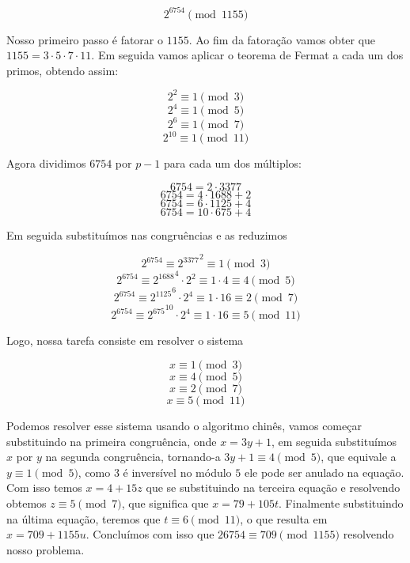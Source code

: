 $$ 2^{6754} \pmod{1155}$$

Nosso primeiro passo \'e fatorar o $1155$. Ao fim da fatora\c{c}\~ao vamos obter que $1155 = 3 \cdot 5 \cdot 7 \cdot 11$. Em seguida vamos aplicar o teorema de Fermat a cada um dos primos, obtendo assim:

$$ 2^2 \equiv 1 \pmod{3}$$
$$ 2^4 \equiv 1 \pmod{5}$$ 
$$ 2^6 \equiv 1 \pmod{7}$$  
$$ 2^{10} \equiv 1 \pmod{11}$$

Agora dividimos $6754$ por $p-1$ para cada um dos m\'ultiplos:

$$6754 = 2 \cdot 3377 $$
$$6754 = 4 \cdot 1688 + 2$$
$$6754 = 6 \cdot 1125 + 4$$
$$6754 = 10 \cdot 675 + 4$$ 

Em seguida substitu\'imos nas congru\^encias e as reduzimos

$$2^{6754} \equiv {2^{3377}}^{2} \equiv 1 \pmod{3} $$  
$$2^{6754} \equiv {2^{1688}}^{4} \cdot 2^2 \equiv 1 \cdot 4 \equiv  4 \pmod{5}$$  
$$2^{6754} \equiv {2^{1125}}^{6} \cdot 2^4 \equiv 1 \cdot 16\equiv  2 \pmod{7}$$ 
$$2^{6754} \equiv {2^{675}}^{10} \cdot 2^4 \equiv 1 \cdot 16\equiv  5 \pmod{11}$$  

Logo, nossa tarefa consiste em resolver o sistema

$$x \equiv 1 \pmod{3}$$
$$x \equiv 4 \pmod{5}$$
$$x \equiv 2 \pmod{7}$$
$$x \equiv 5 \pmod{11}$$  

Podemos resolver esse sistema usando o algoritmo chin\^es, vamos come\c{c}ar substituindo na primeira congru\^encia, onde $x = 3y + 1$, em seguida substitu\'imos $x$ por $y$ na segunda congru\^encia, tornando-a $3y + 1 \equiv 4 \pmod{5}$, que equivale a $y \equiv 1 \pmod{5}$, como $3$ \'e invers\'ivel no m\'odulo $5$ ele pode ser anulado na equa\c{c}\~ao. Com isso temos $x = 4+15z$ que se substituindo na terceira equa\c{c}\~ao e resolvendo obtemos $z \equiv 5 \pmod{7}$, que significa que $x = 79 + 105t$. Finalmente substituindo na \'ultima equa\c{c}\~ao, teremos que $t \equiv 6 \pmod{11}$, o que resulta em $x = 709+1155u$. Conclu\'imos com isso que $26754 \equiv 709 \pmod{1155}$ resolvendo nosso problema. 